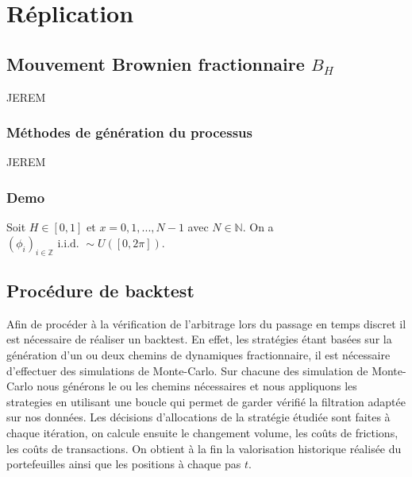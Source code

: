\documentclass[12pt,a4paper]{article}
\begin{document}
\section{Réplication}\label{sec:replication}
\subsection{Mouvement Brownien fractionnaire $B_H$}\label{subsec:generationfbm}
JEREM
\subsubsection{Méthodes de génération du processus}
JEREM
\subsubsection{Demo}
Soit \( H \in [0,1] \) et \(x =  0, 1, ..., N-1  \) avec \(N \in \mathbb{N} \). On a \((\phi_i)_{i \in \mathbb{Z}} \text{ i.i.d. } \sim U([0,2\pi])\).



\subsection{Procédure de backtest}\label{subsec:backtest}
Afin de procéder à la vérification de l'arbitrage lors du passage en temps discret il est nécessaire de réaliser un backtest. En effet, les stratégies étant basées sur la génération d'un ou deux chemins de dynamiques fractionnaire, il est nécessaire d'effectuer des simulations de Monte-Carlo. Sur chacune des simulation de Monte-Carlo nous générons le ou les chemins nécessaires et nous appliquons les strategies en utilisant une boucle qui permet de garder vérifié la filtration adaptée sur nos données. Les décisions d'allocations de la stratégie étudiée sont faites à chaque itération, on calcule ensuite le changement volume, les coûts de frictions, les coûts de transactions. On obtient à la fin la valorisation historique réalisée du portefeuilles ainsi que les positions à chaque pas $t$.
\end{document}
